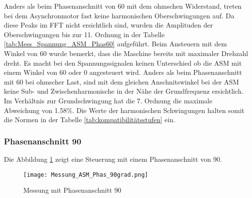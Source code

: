 Anders als beim Phasenanschnitt von 60\textdegree\hspace{0.02cm} mit dem ohmschen Widerstand, treten bei dem Asynchronmotor fast keine harmonischen Oberschwingungen auf. Da diese Peaks im FFT nicht ersichtlich sind, wurden die Amplituden der Oberschwingungen bis zur 11. Ordnung in der Tabelle \ref{tab:Mess_Spannung_ASM_Phas60} aufgeführt. 
Beim Ansteuern mit dem Winkel von 60\textdegree \hspace{0.02cm} wurde bemerkt, dass die Maschine bereits mit maximaler Drehzahl dreht. Es macht bei den Spannungssignalen keinen Unterschied ob die ASM mit einem Winkel von 60\textdegree \hspace{0.02cm} oder 0\textdegree \hspace{0.02cm} angesteuert wird. Anders als beim Phasenanschnitt mit 60\textdegree\hspace{0.02cm} bei ohmscher Last, sind mit dem gleichen Anschnitswinkel bei der ASM keine Sub- und Zwischenharmonische in der Nähe der Grundfrequenz ersichtlich. Im Verhältnis zur Grundschwingung hat die 7. Ordnung die maximale Abweichung von 1.58\%. Die Werte der harmonischen Schwingungen halten somit die Normen in der Tabelle \ref{tab:kompatibilitätsstufen} ein. 

\newpage
\subsubsection*{Phasenanschnitt 90\textdegree}
Die Abbildung \ref{fig:Mess_ASM_Phas90} zeigt eine Steuerung mit einem Phasenanschnitt von 90\textdegree.

\begin{figure}[ht!]
	\centering
	\texttt{[image: Messung\_ASM\_Phas\_90grad.png]}	
	\caption{Messung mit Phasenanschnitt 90\textdegree}\label{fig:Mess_ASM_Phas90}
\end{figure}

